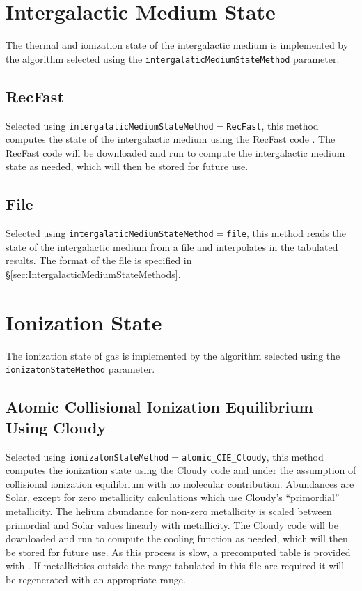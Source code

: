 \section{Intergalactic Medium State}\label{sec:IntergalacticMediumStateMethod}

The thermal and ionization state of the intergalactic medium is implemented by the algorithm selected using the {\tt intergalaticMediumStateMethod} parameter.

\subsection{{\sc RecFast}}

Selected using {\tt intergalaticMediumStateMethod}$=${\tt RecFast}, this method computes the state of the intergalactic medium using the \href{http://www.astro.ubc.ca/people/scott/recfast.html}{{\sc RecFast}} code \cite{seager_how_2000,wong_how_2008}. The {\sc RecFast} code will be downloaded and run to compute the intergalactic medium state as needed, which will then be stored for future use.

\subsection{File}

Selected using {\tt intergalaticMediumStateMethod}$=${\tt file}, this method reads the state of the intergalactic medium from a file and interpolates in the tabulated results. The format of the file is specified in \S\ref{sec:IntergalacticMediumStateMethods}.

\section{Ionization State}\label{sec:IonizationStateMethod}

The ionization state of gas is implemented by the algorithm selected using the {\tt ionizatonStateMethod} parameter.

\subsection{Atomic Collisional Ionization Equilibrium Using {\sc Cloudy}}

Selected using {\tt ionizatonStateMethod}$=${\tt atomic\_CIE\_Cloudy}, this method computes the ionization state using the {\sc Cloudy} code and under the assumption of collisional ionization equilibrium with no molecular contribution. Abundances are Solar, except for zero metallicity calculations which use {\sc Cloudy}'s ``primordial'' metallicity. The helium abundance for non-zero metallicity is scaled between primordial and Solar values linearly with metallicity. The {\sc Cloudy} code will be downloaded and run to compute the cooling function as needed, which will then be stored for future use. As this process is slow, a precomputed table is provided with \glc. If metallicities outside the range tabulated in this file are required it will be regenerated with an appropriate range.

